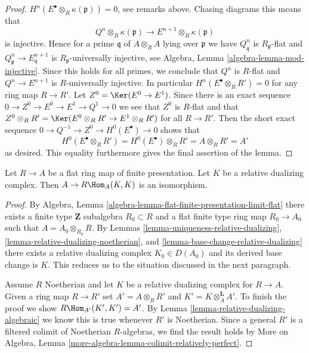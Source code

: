 \begin{proof}
$H^n(E^\bullet \otimes_R \kappa(\mathfrak p)) = 0$, see remarks above.
Chasing diagrams this means that
$$
Q^n \otimes_R \kappa(\mathfrak p) \to E^{n + 1} \otimes_R \kappa(\mathfrak p)
$$
is injective. Hence for a prime $\mathfrak q$ of $A \otimes_R A$
lying over $\mathfrak p$ we have $Q^n_\mathfrak q$ is $R_\mathfrak p$-flat
and $Q^n_\mathfrak p \to E^{n + 1}_\mathfrak q$ is
$R_\mathfrak p$-universally injective, see
Algebra, Lemma \ref{algebra-lemma-mod-injective}.
Since this holds for all primes,
we conclude that $Q^n$ is $R$-flat
and $Q^n \to E^{n + 1}$ is $R$-universally injective. In particular
$H^n(E^\bullet \otimes_R R') = 0$ for any ring map $R \to R'$.
Let $Z^0 = \Ker(E^0 \to E^1)$. Since there is an exact sequence
$0 \to Z^0 \to E^0 \to E^1 \to Q^1 \to 0$ we see that $Z^0$
is $R$-flat and that
$Z^0 \otimes_R R' = \Ker(E^0 \otimes_R R' \to E^1 \otimes_R R')$
for all $R \to R'$. Then the short exact sequence
$0 \to Q^{-1} \to Z^0 \to H^0(E^\bullet) \to 0$
shows that
$$
H^0(E^\bullet \otimes_R R') = H^0(E^\bullet) \otimes_R R'
= A \otimes_R R' = A'
$$
as desired. This equality furthermore gives the final assertion
of the lemma.
\end{proof}

\begin{lemma}
\label{lemma-relative-dualizing-RHom}
Let $R \to A$ be a flat ring map of finite presentation.
Let $K$ be a relative dualizing complex.
Then $A \to R\Hom_A(K, K)$ is an isomorphism.
\end{lemma}

\begin{proof}
By
Algebra, Lemma \ref{algebra-lemma-flat-finite-presentation-limit-flat}
there exists a finite type $\mathbf{Z}$ subalgebra $R_0 \subset R$
and a flat finite type ring map $R_0 \to A_0$ such that
$A = A_0 \otimes_{R_0} R$. By Lemmas
\ref{lemma-uniqueness-relative-dualizing},
\ref{lemma-relative-dualizing-noetherian}, and
\ref{lemma-base-change-relative-dualizing}
there exists a relative dualizing complex $K_0 \in D(A_0)$
and its derived base change is $K$.
This reduces us to the situation discussed in the next paragraph.

\medskip\noindent
Assume $R$ Noetherian and let $K$ be a relative dualizing complex
for $R \to A$. Given a ring map $R \to R'$ set $A' = A \otimes_R R'$
and $K' = K \otimes_A^\mathbf{L} A'$. To finish the proof we show
$R\Hom_{A'}(K', K') = A'$. By Lemma \ref{lemma-relative-dualizing-algebraic}
we know this is true whenever $R'$ is Noetherian.
Since a general $R'$ is a filtered colimit of Noetherian
$R$-algebras, we find the result holds by
More on Algebra, Lemma \ref{more-algebra-lemma-colimit-relatively-perfect}.
\end{proof}


